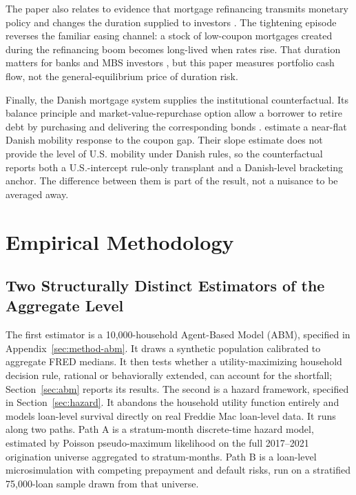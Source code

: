 \documentclass[12pt]{article}
\begin{document}
The paper also relates to evidence that mortgage refinancing transmits monetary
policy and changes the duration supplied to investors
\citep{dimaggio2020,berger2021,eichenbaum2022,krishnamurthy2011,vayanos2021}.
The tightening episode reverses the familiar easing channel: a stock of
low-coupon mortgages created during the refinancing boom becomes long-lived
when rates rise. That duration matters for banks and MBS investors
\citep{jiang2023,malkhozov2016}, but this paper measures portfolio cash flow,
not the general-equilibrium price of duration risk.

Finally, the Danish mortgage system supplies the institutional counterfactual.
Its balance principle and market-value-repurchase option allow a borrower to
retire debt by purchasing and delivering the corresponding bonds
\citep{berg2018,frankel2004,svenstrup2006}. \citet{berger2026} estimate a
near-flat Danish mobility response to the coupon gap. Their slope estimate does
not provide the level of U.S. mobility under Danish rules, so the
counterfactual reports both a U.S.-intercept rule-only transplant and a
Danish-level bracketing anchor. The difference between them is part of the
result, not a nuisance to be averaged away.

\section{Empirical Methodology}\label{sec:method}

\subsection{Two Structurally Distinct Estimators of the Aggregate Level}\label{sec:method-estimators}

The first estimator is a 10,000-household Agent-Based Model (ABM), specified in Appendix~\ref{sec:method-abm}. It draws a synthetic population calibrated to aggregate FRED medians. It then tests whether a utility-maximizing household decision rule, rational or behaviorally extended, can account for the shortfall; Section~\ref{sec:abm} reports its results. The second is a hazard framework, specified in Section~\ref{sec:hazard}. It abandons the household utility function entirely and models loan-level survival directly on real Freddie Mac loan-level data. It runs along two paths. Path A is a stratum-month discrete-time hazard model, estimated by Poisson pseudo-maximum likelihood on the full 2017--2021 origination universe aggregated to stratum-months. Path B is a loan-level microsimulation with competing prepayment and default risks, run on a stratified 75,000-loan sample drawn from that universe.
\end{document}
